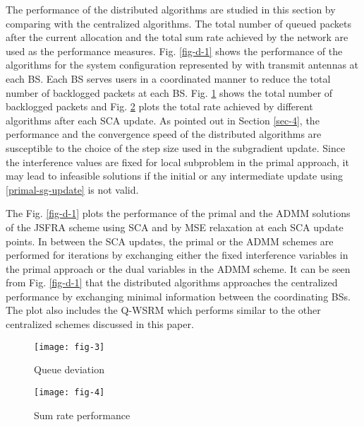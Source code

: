
The performance of the distributed algorithms are studied in this section by comparing with the centralized algorithms. The total number of queued packets after the current allocation and the total sum rate achieved by the network are used as the performance measures. Fig. \ref{fig-d-1} shows the performance of the algorithms for the system configuration represented by  with  transmit antennas at each \ac{BS}. Each \ac{BS} serves  users in a coordinated manner to reduce the total number of backlogged packets at each \ac{BS}. Fig. \ref{fig-d-1.1} shows the total number of backlogged packets  and Fig. \ref{fig-d-1.2} plots the total rate achieved by different algorithms after each \ac{SCA} update. As pointed out in Section \ref{sec-4}, the performance and the convergence speed of the distributed algorithms are susceptible to the choice of the step size used in the subgradient update. Since the interference values are fixed for local subproblem in the primal approach, it may lead to infeasible solutions if the initial or any intermediate update using \eqref{primal-sg-update} is not valid.

The Fig. \ref{fig-d-1} plots the performance of the primal and the \ac{ADMM} solutions of the \ac{JSFRA} scheme using \ac{SCA} and by \ac{MSE} relaxation at each \ac{SCA} update points. In between the \ac{SCA} updates, the primal or the \ac{ADMM} schemes are performed for  iterations by exchanging either the fixed interference variables in the primal approach or the dual variables in the \ac{ADMM} scheme. It can be seen from Fig. \ref{fig-d-1} that the distributed algorithms approaches the centralized performance by exchanging minimal information between the coordinating \acp{BS}. The plot also includes the \ac{Q-WSRM} which performs similar to the other centralized schemes discussed in this paper.
\begin{figure*}
\centering
\begin{subfigure}{0.49\textwidth}
\texttt{[image: fig-3]}
\caption{Queue deviation}
\label{fig-d-1.1}
\end{subfigure}
\hfill
\begin{subfigure}{0.49\textwidth}
\texttt{[image: fig-4]}
\caption{Sum rate performance}
\label{fig-d-1.2}
\end{subfigure}
\caption[short]{Convergence plot for  model}
\label{fig-d-1}
\end{figure*}


